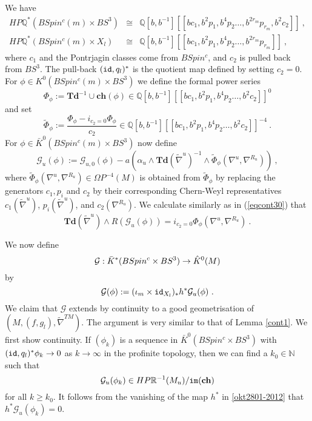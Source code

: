 \documentclass[12pt]{article}
\newcommand{\im}{{\tt im}}
\newcommand{\id}{{\tt id}}
\newcommand{\cG}{{\mathcal{G}}}
\newcommand{\nat}{{\mathbb{N}}}
\newcommand{\Q}{{\mathbb{Q}}}
\newcommand{\R}{{\mathbb{R}}}
\newcommand{\Td}{{\mathbf{Td}}}
\newcommand{\ch}{{\mathbf{ch}}}
\begin{document}
We have
\begin{eqnarray*}HP\Q^{*}(BSpin^{c}(m)\times BS^{3})&\cong& \Q[b,b^{-1}][[bc_{1},b^{2}p_{1},b^{4}p_{2}\dots,b^{2r_{m}}p_{r_{m}},b^{2}c_{2}]]\ ,\\ HP\Q^{*}(BSpin^{c}(m)\times X_{l})&\cong& \Q[b,b^{-1}][[bc_{1},b^{2}p_{1},b^{4}p_{2}\dots,b^{2r_{m}}p_{r_{m}}]]\ ,\end{eqnarray*}
where $c_{1}$ and the Pontrjagin classes come from $BSpin^{c}$, and $c_{2}$ is pulled back from $BS^{3}$.
The pull-back $(\id,q_{l})^{*}$ is the quotient map defined by setting $c_{2}=0$.
For $\phi\in K^{0}(BSpin^{c}(m)\times  BS^{3})$ we define the formal power series
$$\Phi_{\phi}:=\Td^{-1}\cup \ch(\phi)\in \Q[b,b^{-1}][[bc_{1},b^{2}p_{1},b^{4}p_{2}\dots,b^{2}c_{2}]]^{0}$$
and set
$$\tilde \Phi_{\phi}:=\frac{\Phi_{\phi}-i_{c_{2}=0}\Phi_{\phi}}{c_{2}}\in \Q[b,b^{-1}][[bc_{1},b^{2}p_{1},b^{4}p_{2}\dots,b^{2}c_{2}]]^{-4}\ .$$
For $\phi\in  \bar  K^{0}(BSpin^{c}(m)\times BS^{3})$ now define
$$\cG_{u}( \phi) :=\cG_{u,0}( \phi )-a(\alpha_{u}\wedge \Td(\tilde \nabla^{u})^{-1}\wedge \tilde \Phi_{\phi}(\nabla^{u},\nabla^{R_{u}}))\ ,$$
where $\tilde \Phi_{\phi}(\nabla^{u},\nabla^{R_{u}})\in \Omega P^{-4}(M)$ is obtained from $\tilde \Phi_{\phi}$ by replacing
the generators $c_{1},p_{i}$ and $c_{2}$ by their corresponding Chern-Weyl representatives
$c_{1}(\tilde \nabla^{u})$, $p_{i}(\tilde \nabla^{u})$, and $c_{2}(\nabla^{R_{u}})$.
We calculate similarly as in (\ref{eqcont30}) that
\begin{equation}\label{cg20} \Td(\tilde \nabla^{u})\wedge R(\cG_{u}(\phi))=i_{c_{2}=0}\Phi_{\phi}(\nabla^{u},\nabla^{R_{u}})\ .\end{equation}

We now define $$\cG: \textcolor{black}{\bar K^{*}(BSpin^{c}\times  BS^{3})   }\to \hat K^{0}(M)$$ by 
$$\cG( \phi ):=(\iota_{m}\times \id_{X_{l}})_{*}h^{*}\cG_{u}( \phi  )\ .$$
We claim that $\cG$ extends by continuity to a good geometrisation of $(M,(f,g_{l}),\tilde \nabla^{TM})$. 
The argument is very similar to that of Lemma \ref{cont1}.  We first show continuity. If $(\phi_{k})$ is a sequence in
$\bar K^{0}(BSpin^{c}\times BS^{3})$ with $(\id,q_{l})^{*}\phi_{k}\to 0$ as $k\to\infty$ in the profinite topology, 
then we can find a $k_{0}\in \nat $ such that
$$\cG_{u}(\phi_{k})\in HP\R^{-1}(M_{u})/\im(\ch)$$
for all $k\ge k_{0}$.
It follows from the vanishing of the map $h^{*}$ in  \eqref{okt2801-2012} that $h^{*}\cG_{u}(\phi_{k})=0$.
\end{document}
